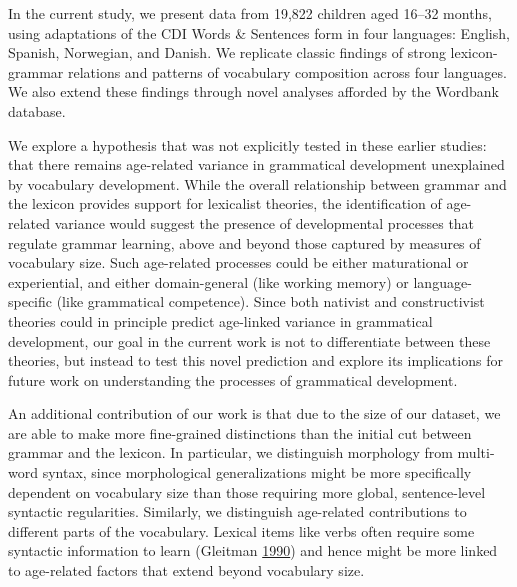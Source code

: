 \documentclass[authoryear, review]{elsarticle}
\begin{document}
In the current study, we present data from 19,822 children aged 16--32
months, using adaptations of the CDI Words \& Sentences form in four
languages: English, Spanish, Norwegian, and Danish. We replicate classic
findings of strong lexicon-grammar relations and patterns of vocabulary
composition across four languages. We also extend these findings through
novel analyses afforded by the Wordbank database.

We explore a hypothesis that was not explicitly tested in these earlier
studies: that there remains age-related variance in grammatical
development unexplained by vocabulary development. While the overall
relationship between grammar and the lexicon provides support for
lexicalist theories, the identification of age-related variance would
suggest the presence of developmental processes that regulate grammar
learning, above and beyond those captured by measures of vocabulary
size. Such age-related processes could be either maturational or
experiential, and either domain-general (like working memory) or
language-specific (like grammatical competence). Since both nativist and
constructivist theories could in principle predict age-linked variance
in grammatical development, our goal in the current work is not to
differentiate between these theories, but instead to test this novel
prediction and explore its implications for future work on understanding
the processes of grammatical development.

An additional contribution of our work is that due to the size of our
dataset, we are able to make more fine-grained distinctions than the
initial cut between grammar and the lexicon. In particular, we
distinguish morphology from multi-word syntax, since morphological
generalizations might be more specifically dependent on vocabulary size
than those requiring more global, sentence-level syntactic regularities.
Similarly, we distinguish age-related contributions to different parts
of the vocabulary. Lexical items like verbs often require some syntactic
information to learn (Gleitman \hyperref[ref-gleitman1990]{1990}) and
hence might be more linked to age-related factors that extend beyond
vocabulary size.
\end{document}
